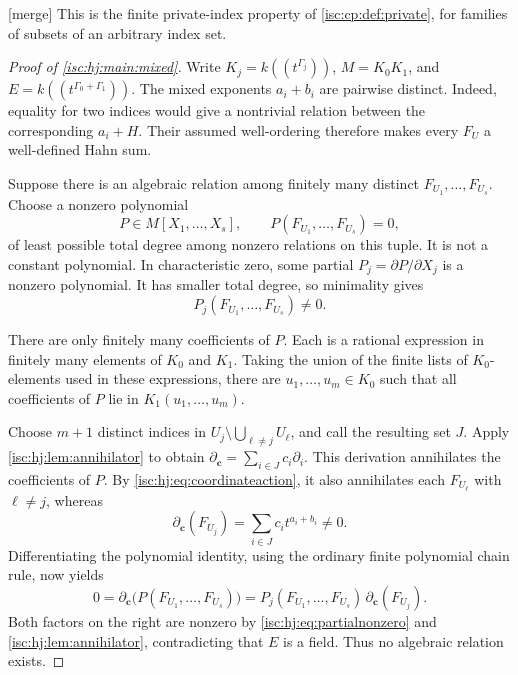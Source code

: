 \documentclass[11pt,letterpaper]{article}
\theoremstyle{definition}
\newtheorem{definition}[theorem]{Definition}
\theoremstyle{remark}
\newcommand{\mtag}{\textup{[merge]}}%
\numberwithin{equation}{section}
\begin{document}

\mtag{} This is the finite private-index property of
\cref{isc:cp:def:private}, for families of subsets of an arbitrary index
set.

\begin{proof}[Proof of \cref{isc:hj:main:mixed}]
Write $K_j=k((t^{\Gamma_j}))$, $M=K_0K_1$, and
$E=k((t^{\Gamma_0+\Gamma_1}))$.
The mixed exponents $a_i+b_i$ are pairwise distinct. Indeed, equality for
two indices would give a nontrivial relation between the corresponding
$a_i+H$. Their assumed well-ordering therefore makes every $F_U$ a
well-defined Hahn sum.

Suppose there is an algebraic relation among finitely many distinct
$F_{U_1},\ldots,F_{U_s}$. Choose a nonzero polynomial
\[
 P\in M[X_1,\ldots,X_s],\qquad
 P(F_{U_1},\ldots,F_{U_s})=0,
\]
of least possible total degree among nonzero relations on this tuple.
It is not a constant polynomial. In characteristic zero, some partial
$P_j=\partial P/\partial X_j$ is a nonzero polynomial. It has smaller
total degree, so minimality gives
\begin{equation}\label{isc:hj:eq:partialnonzero}
 P_j(F_{U_1},\ldots,F_{U_s})\ne0.
\end{equation}

There are only finitely many coefficients of $P$. Each is a rational
expression in finitely many elements of $K_0$ and $K_1$. Taking the union
of the finite lists of $K_0$-elements used in these expressions, there
are $u_1,\ldots,u_m\in K_0$ such that all coefficients of $P$ lie in
$K_1(u_1,\ldots,u_m)$.

Choose $m+1$ distinct indices in
$U_j\setminus\bigcup_{\ell\ne j}U_\ell$, and call the resulting set $J$.
Apply \cref{isc:hj:lem:annihilator} to obtain
$\partial_{\mathbf c}=\sum_{i\in J}c_i\partial_i$.
This derivation annihilates the coefficients of $P$. By
\eqref{isc:hj:eq:coordinateaction}, it also annihilates each $F_{U_\ell}$
with $\ell\ne j$, whereas
\[
 \partial_{\mathbf c}(F_{U_j})=\sum_{i\in J}c_it^{a_i+b_i}\ne0.
\]
Differentiating the polynomial identity, using the ordinary finite
polynomial chain rule, now yields
\[
 0=\partial_{\mathbf c}\bigl(P(F_{U_1},\ldots,F_{U_s})\bigr)
  =P_j(F_{U_1},\ldots,F_{U_s})\,\partial_{\mathbf c}(F_{U_j}).
\]
Both factors on the right are nonzero by \eqref{isc:hj:eq:partialnonzero}
and \cref{isc:hj:lem:annihilator}, contradicting that $E$ is a field.
Thus no algebraic relation exists.
\end{proof}
\end{document}
